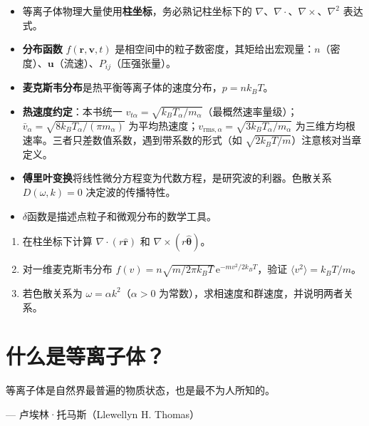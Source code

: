 \documentclass[12pt,a4paper,openany,oneside]{book}
\newcommand{\ee}{\mathrm{e}}
\newcommand{\vect}[1]{\bm{#1}}
\newcommand{\unitvec}[1]{\hat{\vect{#1}}}
\newcommand{\grad}{\nabla}
\newcommand{\curl}{\nabla\times}
\newcommand{\divg}{\nabla\cdot}
\newcommand{\lap}{\nabla^2}
\begin{document}
\begin{chapterreview}
\begin{itemize}
\item 等离子体物理大量使用\textbf{柱坐标}，务必熟记柱坐标下的 $\grad$、$\divg$、$\curl$、$\lap$ 表达式。
\item \textbf{分布函数} $f(\vect{r},\vect{v},t)$ 是相空间中的粒子数密度，其矩给出宏观量：$n$（密度）、$\vect{u}$（流速）、$P_{ij}$（压强张量）。
\item \textbf{麦克斯韦分布}是热平衡等离子体的速度分布，$p=nk_BT$。
\item \textbf{热速度约定}：本书统一 $v_{t\alpha}=\sqrt{k_BT_\alpha/m_\alpha}$（最概然速率量级）；$\bar{v}_\alpha=\sqrt{8k_BT_\alpha/(\pi m_\alpha)}$ 为平均热速度；$v_{\mathrm{rms},\alpha}=\sqrt{3k_BT_\alpha/m_\alpha}$ 为三维方均根速率。三者只差数值系数，遇到带系数的形式（如 $\sqrt{2k_BT/m}$）注意核对当章定义。
\item \textbf{傅里叶变换}将线性微分方程变为代数方程，是研究波的利器。色散关系 $D(\omega,k)=0$ 决定波的传播特性。
\item $\delta$函数是描述点粒子和微观分布的数学工具。
\end{itemize}
\end{chapterreview}

\begin{miniquiz}
\begin{enumerate}
\item 在柱坐标下计算 $\divg(r\unitvec{r})$ 和 $\curl(r\unitvec{\theta})$。
\item 对一维麦克斯韦分布 $f(v) = n\sqrt{m/2\pi k_BT}\,\ee^{-mv^2/2k_BT}$，验证 $\langle v^2 \rangle = k_BT/m$。
\item 若色散关系为 $\omega = \alpha k^2$（$\alpha>0$ 为常数），求相速度和群速度，并说明两者关系。
\end{enumerate}
\end{miniquiz}




\chapter{什么是等离子体？}\label{ch:2}
\epigraph{等离子体是自然界最普遍的物质状态，也是最不为人所知的。}{--- 卢埃林·托马斯（Llewellyn H. Thomas）}
\end{document}
